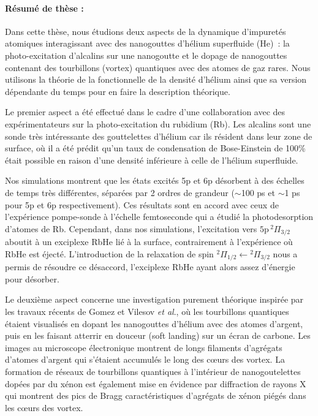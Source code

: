 \documentclass[a4paper, 11pt]{article}
\begin{document}
	\paragraph{Résumé de thèse : } Dans cette thèse, nous étudions deux aspects de la dynamique d'impuretés atomiques interagissant avec des nanogouttes d'hélium superfluide (He)~: la photo-excitation d'alcalins sur une nanogoutte et le dopage de nanogouttes contenant des tourbillons (vortex) quantiques avec des atomes de gaz rares. Nous utilisons la théorie de la fonctionnelle de la densité d'hélium ainsi que sa version dépendante du temps pour en faire la description théorique.

	Le premier aspect a été effectué dans le cadre d'une collaboration avec des expérimentateurs sur la photo-excitation du rubidium (Rb). Les alcalins sont une sonde très intéressante des gouttelettes d'hélium car ils résident dans leur zone de surface, où il a été prédit qu'un taux de condensation de Bose-Einstein de 100\% était possible en raison d'une densité inférieure à celle de l'hélium superfluide.

	Nos simulations montrent que les états excités 5p et 6p désorbent à des échelles de temps très différentes, séparées par 2 ordres de grandeur ($\sim$100 ps et $\sim$1 ps pour  5p et 6p respectivement). Ces résultats sont en accord avec ceux de l'expérience pompe-sonde à l'échelle femtoseconde qui a étudié la photodesorption d'atomes de Rb. Cependant, dans nos simulations, l'excitation vers $5\mathrm{p}\,^2\Pi_{3/2}$ aboutit à un exciplexe RbHe lié à la surface, contrairement à l'expérience où RbHe est éjecté. L'introduction de la relaxation de spin $^2\Pi_{1/2}\leftarrow{^ 2}\Pi_{3/2}$ nous a permis de résoudre ce désaccord, l'exciplexe RbHe ayant alors assez d'énergie pour désorber. 

	Le deuxième aspect concerne une investigation purement théorique inspirée par les travaux récents de Gomez et Vilesov \emph{et al}., où les tourbillons quantiques étaient visualisés en dopant les nanogouttes d'hélium avec des atomes d'argent, puis en les faisant atterrir en douceur (soft landing) sur un écran de carbone. Les images au microscope électronique montrent de longs filaments d'agrégats d'atomes d'argent qui s'étaient accumulés le long des c\oe urs des vortex. La formation de réseaux de tourbillons quantiques à l'intérieur de nanogoutelettes dopées par du xénon est également mise en évidence par diffraction de rayons X qui montrent des pics de Bragg caractéristiques d'agrégats de xénon piégés dans les c\oe urs des vortex.
\end{document}
